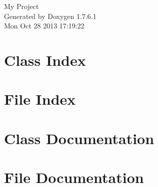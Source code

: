 \documentclass[a4paper]{book}
\begin{document}
\hypersetup{pageanchor=false,citecolor=blue}
\begin{titlepage}
\vspace*{7cm}
\begin{center}
{\Large \-My \-Project }\\
\vspace*{1cm}
{\large \-Generated by Doxygen 1.7.6.1}\\
\vspace*{0.5cm}
{\small Mon Oct 28 2013 17:19:22}\\
\end{center}
\end{titlepage}
\clearemptydoublepage
{}
\tableofcontents
\clearemptydoublepage
{}
\hypersetup{pageanchor=true,citecolor=blue}
\chapter{\-Class \-Index}

\chapter{\-File \-Index}

\chapter{\-Class \-Documentation}












\chapter{\-File \-Documentation}





\printindex
\end{document}
